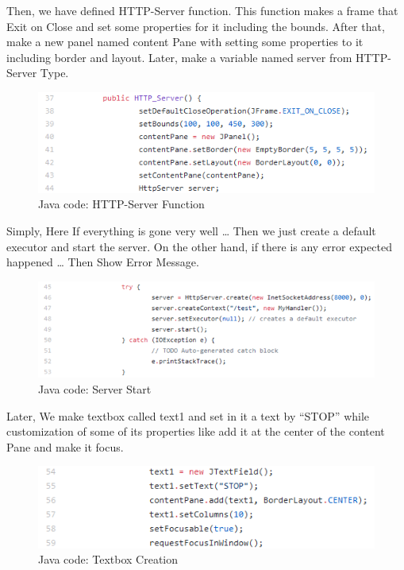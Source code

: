 \documentclass{article}
\begin{document}
\newpage
Then, we have defined HTTP-Server function. This function makes a frame that Exit on Close and set some properties for it including the bounds. After that, make a new panel named content Pane with setting some properties to it including border and layout. Later, make a variable named server from HTTP-Server Type.

\begin{figure}[h]
    \centering
    \includegraphics{figures/44.png}
    \caption{Java code: HTTP-Server Function}
    \label{fig:my_label}
\end{figure}

Simply, Here If everything is gone very well … Then we just create a default executor and start the server. On the other hand, if there is any error expected happened … Then Show Error Message.

\begin{figure}[h]
    \centering
    \includegraphics[width=1\textwidth]{figures/45.png}
    \caption{Java code: Server Start}
    \label{fig:my_label}
\end{figure}

\newpage

Later, We make textbox called text1 and set in it a text by “STOP” while customization of some of its properties like add it at the center of the content Pane and make it focus.

\begin{figure}[h]
    \centering
    \includegraphics{figures/46.png}
    \caption{Java code: Textbox Creation}
    \label{fig:my_label}
\end{figure}
\end{document}
